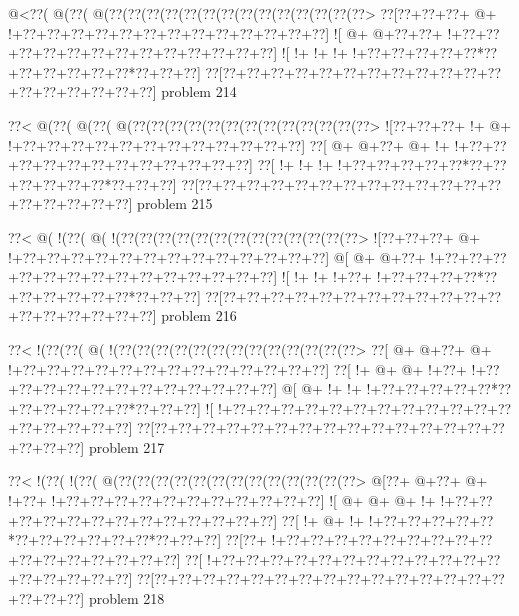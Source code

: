 \vbox{\vbox{\goo
\- @<\0??(\- @(\0??(\- @(\0??(\0??(\0??(\0??(\0??(\0??(\0??(\0??(\0??(\0??(\0??(\0??(\0??(\0??>
\0??[\0??+\0??+\0??+\- @+\- !+\0??+\0??+\0??+\0??+\0??+\0??+\0??+\0??+\0??+\0??+\0??+\0??+\0??]
\- ![\- @+\- @+\0??+\0??+\- !+\0??+\0??+\0??+\0??+\0??+\0??+\0??+\0??+\0??+\0??+\0??+\0??+\0??]
\- ![\- !+\- !+\- !+\- !+\0??+\0??+\0??+\0??+\0??*\0??+\0??+\0??+\0??+\0??+\0??*\0??+\0??+\0??]
\0??[\0??+\0??+\0??+\0??+\0??+\0??+\0??+\0??+\0??+\0??+\0??+\0??+\0??+\0??+\0??+\0??+\0??+\0??]
}
\hfil problem 214\hfil\break
}



\vbox{\vbox{\goo
\0??<\- @(\0??(\- @(\0??(\- @(\0??(\0??(\0??(\0??(\0??(\0??(\0??(\0??(\0??(\0??(\0??(\0??(\0??>
\- ![\0??+\0??+\0??+\- !+\- @+\- !+\0??+\0??+\0??+\0??+\0??+\0??+\0??+\0??+\0??+\0??+\0??+\0??]
\0??[\- @+\- @+\0??+\- @+\- !+\- !+\0??+\0??+\0??+\0??+\0??+\0??+\0??+\0??+\0??+\0??+\0??+\0??]
\0??[\- !+\- !+\- !+\- !+\0??+\0??+\0??+\0??+\0??*\0??+\0??+\0??+\0??+\0??+\0??*\0??+\0??+\0??]
\0??[\0??+\0??+\0??+\0??+\0??+\0??+\0??+\0??+\0??+\0??+\0??+\0??+\0??+\0??+\0??+\0??+\0??+\0??]
}
\hfil problem 215\hfil\break
}



\vbox{\vbox{\goo
\0??<\- @(\- !(\0??(\- @(\- !(\0??(\0??(\0??(\0??(\0??(\0??(\0??(\0??(\0??(\0??(\0??(\0??(\0??>
\- ![\0??+\0??+\0??+\- @+\- !+\0??+\0??+\0??+\0??+\0??+\0??+\0??+\0??+\0??+\0??+\0??+\0??+\0??]
\- @[\- @+\- @+\0??+\- !+\0??+\0??+\0??+\0??+\0??+\0??+\0??+\0??+\0??+\0??+\0??+\0??+\0??+\0??]
\- ![\- !+\- !+\- !+\0??+\- !+\0??+\0??+\0??+\0??*\0??+\0??+\0??+\0??+\0??+\0??*\0??+\0??+\0??]
\0??[\0??+\0??+\0??+\0??+\0??+\0??+\0??+\0??+\0??+\0??+\0??+\0??+\0??+\0??+\0??+\0??+\0??+\0??]
}
\hfil problem 216\hfil\break
}



\vbox{\vbox{\goo
\0??<\- !(\0??(\0??(\- @(\- !(\0??(\0??(\0??(\0??(\0??(\0??(\0??(\0??(\0??(\0??(\0??(\0??(\0??>
\0??[\- @+\- @+\0??+\- @+\- !+\0??+\0??+\0??+\0??+\0??+\0??+\0??+\0??+\0??+\0??+\0??+\0??+\0??]
\0??[\- !+\- @+\- @+\- !+\0??+\- !+\0??+\0??+\0??+\0??+\0??+\0??+\0??+\0??+\0??+\0??+\0??+\0??]
\- @[\- @+\- !+\- !+\- !+\0??+\0??+\0??+\0??+\0??*\0??+\0??+\0??+\0??+\0??+\0??*\0??+\0??+\0??]
\- ![\- !+\0??+\0??+\0??+\0??+\0??+\0??+\0??+\0??+\0??+\0??+\0??+\0??+\0??+\0??+\0??+\0??+\0??]
\0??[\0??+\0??+\0??+\0??+\0??+\0??+\0??+\0??+\0??+\0??+\0??+\0??+\0??+\0??+\0??+\0??+\0??+\0??]
}
\hfil problem 217\hfil\break
}



\vbox{\vbox{\goo
\0??<\- !(\0??(\- !(\0??(\- @(\0??(\0??(\0??(\0??(\0??(\0??(\0??(\0??(\0??(\0??(\0??(\0??(\0??>
\- @[\0??+\- @+\0??+\- @+\- !+\0??+\- !+\0??+\0??+\0??+\0??+\0??+\0??+\0??+\0??+\0??+\0??+\0??]
\- ![\- @+\- @+\- @+\- !+\- !+\0??+\0??+\0??+\0??+\0??+\0??+\0??+\0??+\0??+\0??+\0??+\0??+\0??]
\0??[\- !+\- @+\- !+\- !+\0??+\0??+\0??+\0??+\0??*\0??+\0??+\0??+\0??+\0??+\0??*\0??+\0??+\0??]
\0??[\0??+\- !+\0??+\0??+\0??+\0??+\0??+\0??+\0??+\0??+\0??+\0??+\0??+\0??+\0??+\0??+\0??+\0??]
\0??[\- !+\0??+\0??+\0??+\0??+\0??+\0??+\0??+\0??+\0??+\0??+\0??+\0??+\0??+\0??+\0??+\0??+\0??]
\0??[\0??+\0??+\0??+\0??+\0??+\0??+\0??+\0??+\0??+\0??+\0??+\0??+\0??+\0??+\0??+\0??+\0??+\0??]
}
\hfil problem 218\hfil\break
}



